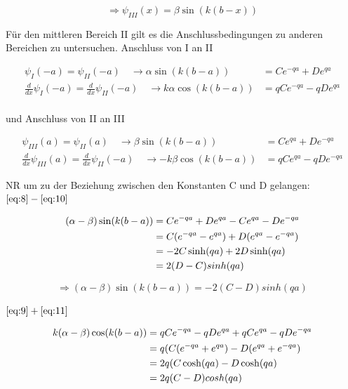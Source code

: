 \begin{equation}
  \label{eq:7}
  \Rightarrow \psi_{III}(x)=\beta\sin(k(b-x))
\end{equation}

Für den mittleren Bereich II gilt es die Anschlussbedingungen zu anderen Bereichen zu untersuchen. Anschluss von I an II


\begin{align}
  \psi_{I}(-a) = \psi_{II}(-a) \quad\rightarrow    \alpha\sin(k(b-a)) &= Ce^{-qa}+De^{qa} \label{eq:8} \\
\frac{d}{dx}\psi_{I}(-a) =\frac{d}{dx}\psi_{II}(-a) \quad \rightarrow   k\alpha\cos(k(b-a)) &= qCe^{-qa}-qDe^{qa}\label{eq:9}
\end{align}
\\
und Anschluss von II an III

\begin{align}
  \psi_{III}(a) = \psi_{II}(a) \quad\rightarrow  \beta\sin(k(b-a)) &= Ce^{qa}+De^{-qa} \label{eq:10} \\
  \frac{d}{dx}\psi_{III}(a) =\frac{d}{dx}\psi_{II}(-a) \quad\rightarrow   -k\beta\cos(k(b-a)) &= qCe^{qa}-qDe^{-qa} \label{eq:11}
\end{align}

NR um zu der Beziehung zwischen den Konstanten C und D gelangen:
\( \eqref{eq:8}-\eqref{eq:10}  \)

\begin{align}
  \label{eq:12}
  (\alpha-\beta)\sin(k(b-a)) &= Ce^{-qa}+De^{qa}- Ce^{qa}-De^{-qa} \notag \\
&= C(e^{-qa}- e^{qa})+D(e^{qa}-e^{-qa}) \notag\\
&=-2C\sinh(qa)+2D\sinh(qa) \notag\\
&=2(D-C)sinh(qa)
\end{align}

\begin{equation}
  \label{eq:13}
 \Rightarrow  (\alpha-\beta)\sin(k(b-a))=-2(C-D)sinh(qa)
\end{equation}

\( \eqref{eq:9}+\eqref{eq:11}  \)

\begin{align}
  \label{eq:14}
  k(\alpha-\beta)\cos(k(b-a)) &= qCe^{-qa}-qDe^{qa}+ qCe^{qa}-qDe^{-qa}  \notag\\
&= q(C(e^{-qa}+ e^{qa})-D(e^{qa}+e^{-qa}) \notag\\
&= 2q(C\cosh(qa)-D\cosh(qa) \notag\\
&=2q(C-D)cosh(qa)
\end{align}

